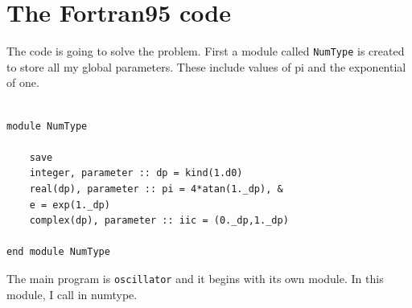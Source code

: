 \documentclass[12pt]{article}
\begin{document}
\section{The Fortran95 code}

The code is going to solve the problem. First a module called {\tt NumType} is created to store all my global parameters. These include values of pi and the exponential of one. 
\begin{lstlisting}[frame=single,caption={Module {\tt NumType}},label=module]

module NumType

	save
	integer, parameter :: dp = kind(1.d0)
	real(dp), parameter :: pi = 4*atan(1._dp), &
	e = exp(1._dp)
	complex(dp), parameter :: iic = (0._dp,1._dp)
	
end module NumType

\end{lstlisting}

The main program is {\tt oscillator} and it begins with its own module. In this module, I call in numtype.
\end{document}
